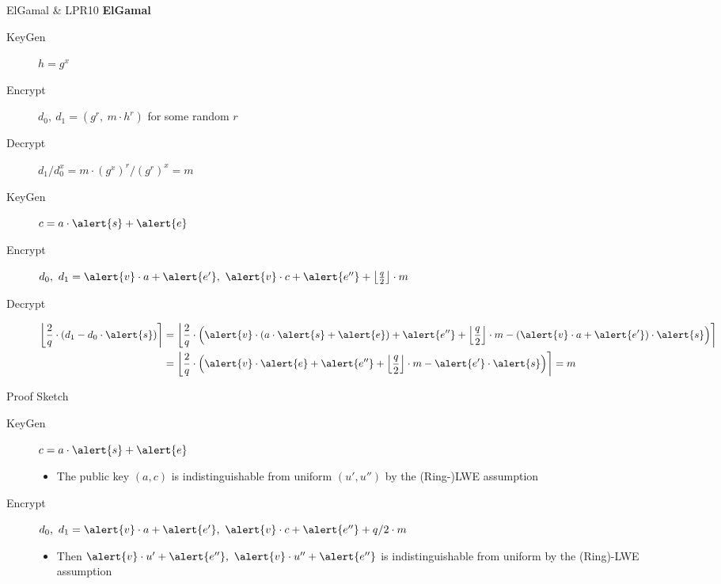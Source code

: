 \documentclass[xcolor=table,10pt,aspectratio=169]{beamer}
\begin{document}
\begin{frame}[label={sec:orgb64f6b9}]{ElGamal \& LPR10}
\textbf{ElGamal}

\begin{description}
\item[{KeyGen}] \(h = g^{x}\)
\item[{Encrypt}] \(d_{0},\ d_{1} = \left({g^{r},\  m \cdot h^{r}}\right)\) for some random \(r\)
\item[{Decrypt}] \(d_{1} / d_{0}^{x} = m \cdot (g^{x})^{r} / (g^{r})^{x} = m\)
\end{description}

\textbf{\cite{EC:LyuPeiReg10}}

\begin{description}
\item[{KeyGen}] \(c = a \cdot \alert{s} + \alert{e}\)
\item[{Encrypt}] \(d_{0}, \ d_{1} = \alert{v} \cdot a + \alert{e'},\ \alert{v} \cdot c + \alert{e''} +\left\lfloor \frac{q}{2} \right\rfloor  \cdot m\)
\item[{Decrypt}] \begin{align*}
\left\lfloor \frac{2}{q} \cdot \left(d_{1} - d_{0} \cdot \alert{s}\right) \right\rceil &= \left\lfloor \frac{2}{q} \cdot \left({\alert{v} \cdot (a \cdot \alert{s} + \alert{e}) + \alert{e''} + \left\lfloor \frac{q}{2} \right\rfloor \cdot m - \left(\alert{v} \cdot a + \alert{e'}\right) \cdot \alert{s}}\right) \right\rceil\\
&= \left\lfloor \frac{2}{q} \cdot \left({\alert{v} \cdot \alert{e} + \alert{e''} + \left\lfloor \frac{q}{2} \right\rfloor  \cdot m - \alert{e'} \cdot \alert{s}}\right) \right\rceil = m\\
\end{align*}
\end{description}
\end{frame}
\begin{frame}[label={sec:org38dd82f}]{Proof Sketch}
\begin{description}
\item[{KeyGen}] \(c = a \cdot \alert{s} + \alert{e}\)
\begin{itemize}
\item The public key \((a,c)\) is indistinguishable from uniform \((u', u'')\) by the (Ring-)LWE assumption
\end{itemize}

\item[{Encrypt}] \(d_{0}, \ d_{1} = \alert{v} \cdot a + \alert{e'},\ \alert{v} \cdot c + \alert{e''} + q/2 \cdot m\)
\begin{itemize}
\item Then \(\alert{v} \cdot u' + \alert{e''},\ \alert{v} \cdot u'' + \alert{e''}\) is indistinguishable from uniform by the (Ring)-LWE assumption
\end{itemize}
\end{description}
\end{frame}
\end{document}
